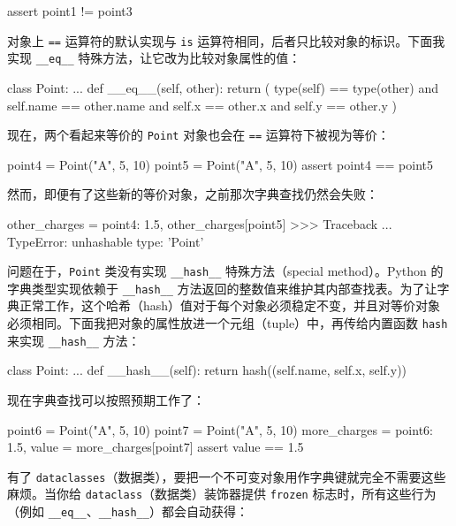 \begin{codebox}[python]
assert point1 != point3
\end{codebox}

对象上 \texttt{==} 运算符的默认实现与 \texttt{is} 运算符相同，后者只比较对象的标识。下面我实现 \texttt{\_\_eq\_\_} 特殊方法，让它改为比较对象属性的值：

\begin{codebox}[python]
class Point:
    ...
    def __eq__(self, other):
        return (
            type(self) == type(other)
            and self.name == other.name
            and self.x == other.x
            and self.y == other.y
        )
\end{codebox}

现在，两个看起来等价的 \texttt{Point} 对象也会在 \texttt{==} 运算符下被视为等价：

\begin{codebox}[python]
point4 = Point("A", 5, 10)
point5 = Point("A", 5, 10)
assert point4 == point5
\end{codebox}

然而，即便有了这些新的等价对象，之前那次字典查找仍然会失败：

\begin{codebox}[python]
other_charges = {
    point4: 1.5,
}
other_charges[point5]
>>>
Traceback ...
TypeError: unhashable type: 'Point'
\end{codebox}

问题在于，\texttt{Point} 类没有实现 \texttt{\_\_hash\_\_} 特殊方法（special method）。Python 的字典类型实现依赖于 \texttt{\_\_hash\_\_} 方法返回的整数值来维护其内部查找表。为了让字典正常工作，这个哈希（hash）值对于每个对象必须稳定不变，并且对等价对象必须相同。下面我把对象的属性放进一个元组（tuple）中，再传给内置函数 \texttt{hash} 来实现 \texttt{\_\_hash\_\_} 方法：

\begin{codebox}[python]
class Point:
    ...
    def __hash__(self):
        return hash((self.name, self.x, self.y))
\end{codebox}

现在字典查找可以按照预期工作了：

\begin{codebox}[python]
point6 = Point("A", 5, 10)
point7 = Point("A", 5, 10)
more_charges = {
    point6: 1.5,
}
value = more_charges[point7]
assert value == 1.5
\end{codebox}

有了 \texttt{dataclasses}（数据类），要把一个不可变对象用作字典键就完全不需要这些麻烦。当你给 \texttt{dataclass}（数据类）装饰器提供 \texttt{frozen} 标志时，所有这些行为（例如 \texttt{\_\_eq\_\_}、\texttt{\_\_hash\_\_}）都会自动获得：

